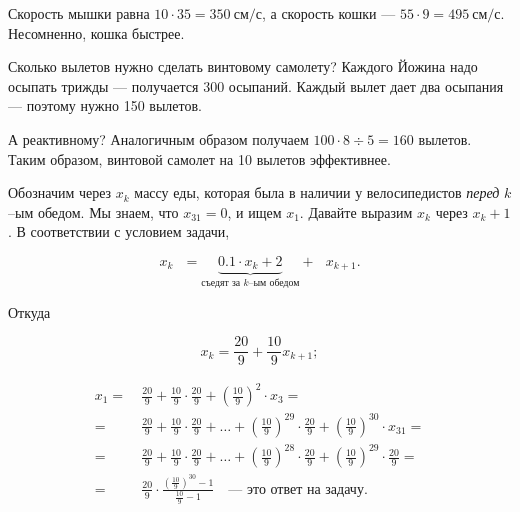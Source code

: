 ﻿
\begin{itemize}
\itA Скорость мышки равна $10 \cdot 35 = \SI{350}{\text{см}/\text{с}}$, а скорость кошки — $55 \cdot 9 = \SI{495}{\text{см}/\text{с}}$. Несомненно, кошка быстрее.

\itB Сколько вылетов нужно сделать винтовому самолету? Каждого Йожина надо осыпать трижды — получается 300 осыпаний. Каждый вылет дает два осыпания — поэтому нужно 150 вылетов.

\ms А реактивному? Аналогичным образом получаем $100 \cdot 8 \div 5 = 160$ вылетов. Таким образом, винтовой самолет на 10 вылетов эффективнее.

\itC Обозначим через $x_k$ массу еды, которая была в наличии у велосипедистов {\itshape перед} $k$--ым обедом. Мы знаем, что $x_{31}=0$, и ищем $x_1$. Давайте выразим $x_k$ через $x_k+1$. В соответствии с условием задачи,

$$x_k\ \ \ = \underbrace{0.1 \cdot x_k + 2}_{\text{съедят за $k$--ым обедом}} +\ \ \ x_{k+1}.$$

Откуда

$$x_k = \frac{20}{9} + \frac{10}{9} x_{k+1};$$

\begin{align*}
x_1 =\ & \frac{20}{9} + \frac{10}{9} \cdot \frac{20}{9} + \left(\frac{10}{9}\right)^2 \cdot x_3 = \\
=\ & \frac{20}{9} + \frac{10}{9} \cdot \frac{20}{9} + \ldots + \left(\frac{10}{9}\right)^{29}
	\cdot\frac{20}{9} + \left(\frac{10}{9}\right)^{30} \cdot x_{31} = \\
=\ & \frac{20}{9} + \frac{10}{9} \cdot \frac{20}{9} + \ldots + \left(\frac{10}{9}\right)^{28}
	\cdot\frac{20}{9} + \left(\frac{10}{9}\right)^{29} \cdot \frac{20}{9} = \\
=\ & \frac{20}{9} \cdot \frac{\left(\tfrac{10}{9}\right)^{30}-1}{\tfrac{10}{9}-1}
	\quad \text{— это ответ на задачу.}
\end{align*}

\end{itemize}